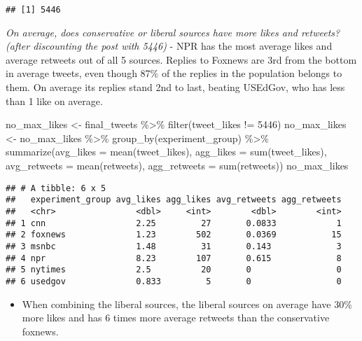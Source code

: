 \documentclass[
]{article}
\newenvironment{Shaded}{\begin{snugshade}}{\end{snugshade}}
\newcommand{\AttributeTok}[1]{\textcolor[rgb]{0.77,0.63,0.00}{#1}}
\newcommand{\DecValTok}[1]{\textcolor[rgb]{0.00,0.00,0.81}{#1}}
\newcommand{\FunctionTok}[1]{\textcolor[rgb]{0.00,0.00,0.00}{#1}}
\newcommand{\NormalTok}[1]{#1}
\newcommand{\OtherTok}[1]{\textcolor[rgb]{0.56,0.35,0.01}{#1}}
\newcommand{\SpecialCharTok}[1]{\textcolor[rgb]{0.00,0.00,0.00}{#1}}
\providecommand{\tightlist}{%
  \setlength{\itemsep}{0pt}\setlength{\parskip}{0pt}}
\begin{document}
\begin{verbatim}
## [1] 5446
\end{verbatim}

\emph{On average, does conservative or liberal sources have more likes
and retweets? (after discounting the post with 5446)} - NPR has the most
average likes and average retweets out of all 5 sources. Replies to
Foxnews are 3rd from the bottom in average tweets, even though 87\% of
the replies in the population belongs to them. On average its replies
stand 2nd to last, beating USEdGov, who has less than 1 like on average.

\begin{Shaded}
\begin{Highlighting}[]
\NormalTok{no\_max\_likes }\OtherTok{\textless{}{-}}\NormalTok{ final\_tweets }\SpecialCharTok{\%\textgreater{}\%} \FunctionTok{filter}\NormalTok{(tweet\_likes }\SpecialCharTok{!=} \DecValTok{5446}\NormalTok{)}
\NormalTok{no\_max\_likes }\OtherTok{\textless{}{-}}\NormalTok{ no\_max\_likes }\SpecialCharTok{\%\textgreater{}\%} \FunctionTok{group\_by}\NormalTok{(experiment\_group) }\SpecialCharTok{\%\textgreater{}\%} 
  \FunctionTok{summarize}\NormalTok{(}\AttributeTok{avg\_likes =} \FunctionTok{mean}\NormalTok{(tweet\_likes), }\AttributeTok{agg\_likes =} \FunctionTok{sum}\NormalTok{(tweet\_likes), }
            \AttributeTok{avg\_retweets =} \FunctionTok{mean}\NormalTok{(retweets), }\AttributeTok{agg\_retweets =} \FunctionTok{sum}\NormalTok{(retweets))}
\NormalTok{no\_max\_likes}
\end{Highlighting}
\end{Shaded}

\begin{verbatim}
## # A tibble: 6 x 5
##   experiment_group avg_likes agg_likes avg_retweets agg_retweets
##   <chr>                <dbl>     <int>        <dbl>        <int>
## 1 cnn                  2.25         27       0.0833            1
## 2 foxnews              1.23        502       0.0369           15
## 3 msnbc                1.48         31       0.143             3
## 4 npr                  8.23        107       0.615             8
## 5 nytimes              2.5          20       0                 0
## 6 usedgov              0.833         5       0                 0
\end{verbatim}

\begin{itemize}
\tightlist
\item
  When combining the liberal sources, the liberal sources on average
  have 30\% more likes and has 6 times more average retweets than the
  conservative foxnews.
\end{itemize}
\end{document}
